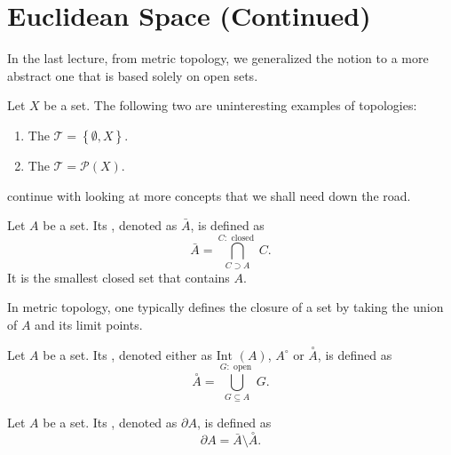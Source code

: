 \documentclass[notoc,notitlepage]{tufte-book}
\newcommand{\Int}[1]{\overset{\circ}{#1}}
\begin{document}
\section{Euclidean Space (Continued)}%
\label{sec:euclidean_space_continued}

In the last lecture, from metric topology, 
we generalized the notion to a more abstract one
that is based solely on open sets.

\begin{eg}
  Let $X$ be a set. The following two are
  uninteresting examples of topologies:
  \begin{enumerate}
    \item The  $\mathcal{T} = \left\{ \emptyset, X \right\}$.
    \item The  $\mathcal{T} = \mathcal{P}(X)$.
  \end{enumerate}
\end{eg}

 continue with looking at
more concepts that we shall need down the road.

\begin{defn}\label{defn:closure_of_a_set}
  Let $A$ be a set. Its ,
  denoted as $\bar{A}$, is defined as
  \begin{equation*}
    \bar{A} = \bigcap_{C \supset A}^{C: \text{ closed }} C. 
  \end{equation*}
  It is the smallest closed set that contains $A$.
\end{defn}

\begin{note}
  In metric topology, one typically defines the closure of a set by taking the union of $A$ and its limit points.
\end{note}

\begin{defn}\label{defn:interior_of_a_set}
  Let $A$ be a set. Its , 
  denoted either as $\text{Int }(A)$, $A^\circ$ or $\Int{A}$,
  is defined as
  \begin{equation*}
    \Int{A} = \bigcup_{G \subseteq A}^{G: \text{ open }} G.
  \end{equation*}
\end{defn}

\begin{defn}\label{defn:boundary_of_a_set}
  Let $A$ be a set. Its ,
  denoted as $\partial A$, is defined as
  \begin{equation*}
    \partial A = \bar{A} \setminus \Int{A}.
  \end{equation*}
\end{defn}
\end{document}
